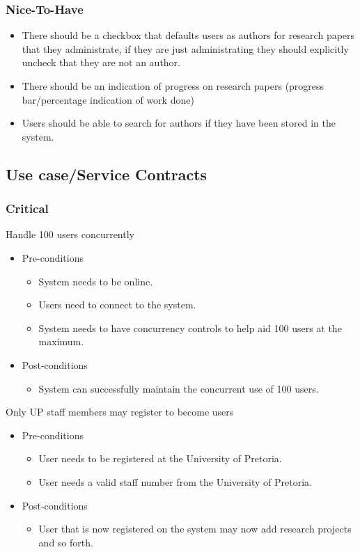 \documentclass[a4paper,12pt]{report}
\begin{document}
\subsubsection{Nice-To-Have}
\begin{itemize}
	\item There should be a checkbox that defaults users as authors for research papers that they administrate, if they are just administrating they should explicitly uncheck that they are not an author.
	\item There should be an indication of progress on research papers (progress bar/percentage indication of work done)
	\item Users should be able to search for authors if they have been stored in the system.
\end{itemize}


	
\subsection{Use case/Service Contracts}
\subsubsection{Critical}
	Handle 100 users concurrently
	\begin{itemize}
		\item Pre-conditions
			\begin{itemize}
				\item System needs to be online.
				\item Users need to connect to the system.
				\item System needs to have concurrency controls to help aid 100 users at the maximum.
			\end{itemize}
		\item Post-conditions
			\begin{itemize}
				\item System can successfully maintain the concurrent use of 100 users.
			\end{itemize}
	\end{itemize}

	Only UP staff members may register to become users
	\begin{itemize}
		\item Pre-conditions
			\begin{itemize}
				\item User needs to be registered at the University of Pretoria.
				\item User needs a valid staff number from the University of Pretoria.
			\end{itemize}
		\item Post-conditions
			\begin{itemize}
				\item User that is now registered on the system may now add research projects and so forth.
			\end{itemize}
	\end{itemize}
\end{document}
